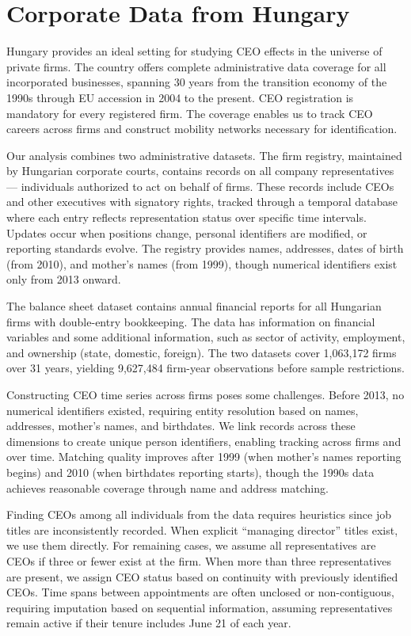 \documentclass[11pt,a4paper]{article}
\begin{document}
\section{Corporate Data from Hungary}

Hungary provides an ideal setting for studying CEO effects in the universe of private firms. The country offers complete administrative data coverage for all incorporated businesses, spanning 30 years from the transition economy of the 1990s through EU accession in 2004 to the present. CEO registration is mandatory for every registered firm. The coverage enables us to track CEO careers across firms and construct mobility networks necessary for identification.

Our analysis combines two administrative datasets. The firm registry, maintained by Hungarian corporate courts, contains records on all company representatives — individuals authorized to act on behalf of firms. These records include CEOs and other executives with signatory rights, tracked through a temporal database where each entry reflects representation status over specific time intervals. Updates occur when positions change, personal identifiers are modified, or reporting standards evolve. The registry provides names, addresses, dates of birth (from 2010), and mother's names (from 1999), though numerical identifiers exist only from 2013 onward.

The balance sheet dataset contains annual financial reports for all Hungarian firms with double-entry bookkeeping. The data has information on financial variables and some additional information, such as sector of activity, employment, and ownership (state, domestic, foreign). The two datasets cover 1,063,172 firms over 31 years, yielding 9,627,484 firm-year observations before sample restrictions.

Constructing CEO time series across firms poses some challenges. Before 2013, no numerical identifiers existed, requiring entity resolution based on names, addresses, mother's names, and birthdates. We link records across these dimensions to create unique person identifiers, enabling tracking across firms and over time. Matching quality improves after 1999 (when mother's names reporting begins) and 2010 (when birthdates reporting starts), though the 1990s data achieves reasonable coverage through name and address matching. 

Finding CEOs among all individuals from the data requires heuristics since job titles are inconsistently recorded. When explicit ``managing director'' titles exist, we use them directly. For remaining cases, we assume all representatives are CEOs if three or fewer exist at the firm. When more than three representatives are present, we assign CEO status based on continuity with previously identified CEOs. Time spans between appointments are often unclosed or non-contiguous, requiring imputation based on sequential information, assuming representatives remain active if their tenure includes June 21 of each year.
\end{document}
